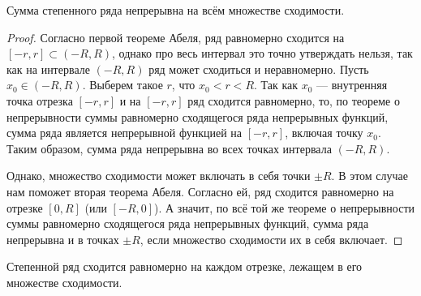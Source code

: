 \documentclass[a4paper, 12pt]{article}
\begin{document}
\begin{Consequence}
Сумма степенного ряда непрерывна на всём множестве сходимости.
\end{Consequence}

\begin{proof}
Согласно первой теореме Абеля, ряд равномерно сходится на $\left [ -r,r \right ] \subset \left ( -R, R \right )$, однако про весь интервал это точно утверждать нельзя, так как на интервале $\left ( -R, R \right )$ ряд может сходиться и неравномерно. Пусть $x_{0}\in\left ( -R, R \right )$. Выберем такое $r$, что $x_{0}<r<R$. Так как $x_{0}$ --- внутренняя точка отрезка $\left [ -r, r \right ]$ и на $\left [ -r, r \right ]$ ряд  сходится равномерно, то, по теореме о непрерывности суммы равномерно сходящегося ряда непрерывных функций, сумма ряда является непрерывной функцией на $\left [ -r,r \right ]$, включая точку $x_{0}$.
Таким образом, сумма ряда непрерывна во всех точках интервала $\left ( -R, R \right )$.
 
Однако, множество сходимости может включать в себя точки $\pm R$. В этом случае нам поможет вторая теорема Абеля. Согласно ей, ряд сходится равномерно на отрезке $[0, R]$ (или  $[-R, 0]$). А значит, по всё той же теореме о непрерывности суммы равномерно сходящегося ряда непрерывных функций, сумма ряда непрерывна и в точках $\pm R$, если множество сходимости их в себя включает.
\end{proof}

\begin{Consequence}
Степенной ряд сходится равномерно на каждом отрезке, лежащем в его множестве сходимости.
\end{Consequence}
\end{document}
